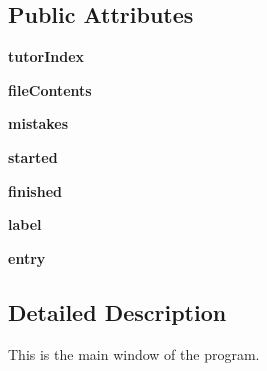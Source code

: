 \subsection*{Public Attributes}
\begin{DoxyCompactItemize}
\item 
\hypertarget{classmain_1_1_main_frame_a74d69b9333c27fe6d4f9139f7c5c1f82}{{\bfseries tutor\+Index}}\label{classmain_1_1_main_frame_a74d69b9333c27fe6d4f9139f7c5c1f82}

\item 
\hypertarget{classmain_1_1_main_frame_a28011140dba0f8e2e947a3591840504c}{{\bfseries file\+Contents}}\label{classmain_1_1_main_frame_a28011140dba0f8e2e947a3591840504c}

\item 
\hypertarget{classmain_1_1_main_frame_adaaeafe2b7295d1312d00c0c0d05ea5a}{{\bfseries mistakes}}\label{classmain_1_1_main_frame_adaaeafe2b7295d1312d00c0c0d05ea5a}

\item 
\hypertarget{classmain_1_1_main_frame_a22e8029065c06ac730cbe5d964458e74}{{\bfseries started}}\label{classmain_1_1_main_frame_a22e8029065c06ac730cbe5d964458e74}

\item 
\hypertarget{classmain_1_1_main_frame_a6ef5d668539081684c72da05deacbbc6}{{\bfseries finished}}\label{classmain_1_1_main_frame_a6ef5d668539081684c72da05deacbbc6}

\item 
\hypertarget{classmain_1_1_main_frame_ac81eb129666f11a4ce1574884b5f6c42}{{\bfseries label}}\label{classmain_1_1_main_frame_ac81eb129666f11a4ce1574884b5f6c42}

\item 
\hypertarget{classmain_1_1_main_frame_a718d5aa6cc6cca8dd84a18c6df1a7eef}{{\bfseries entry}}\label{classmain_1_1_main_frame_a718d5aa6cc6cca8dd84a18c6df1a7eef}

\end{DoxyCompactItemize}


\subsection{Detailed Description}
\begin{DoxyVerb}This is the main window of the program.\end{DoxyVerb}
 

